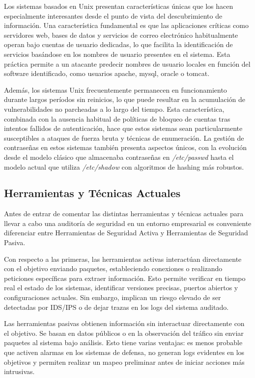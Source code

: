\documentclass[runningheads]{llncs}
\begin{document}
Los sistemas basados en Unix presentan características únicas que los hacen especialmente interesantes desde el punto de vista del descubrimiento de información. Una característica fundamental es que las aplicaciones críticas como servidores web, bases de datos y servicios de correo electrónico habitualmente operan bajo cuentas de usuario dedicadas, lo que facilita la identificación de servicios basándose en los nombres de usuario presentes en el sistema. Esta práctica permite a un atacante predecir nombres de usuario locales en función del software identificado, como usuarios apache, mysql, oracle o tomcat.

Además, los sistemas Unix frecuentemente permanecen en funcionamiento durante largos períodos sin reinicios, lo que puede resultar en la acumulación de vulnerabilidades no parcheadas a lo largo del tiempo. Esta característica, combinada con la ausencia habitual de políticas de bloqueo de cuentas tras intentos fallidos de autenticación, hace que estos sistemas sean particularmente susceptibles a ataques de fuerza bruta y técnicas de enumeración. La gestión de contraseñas en estos sistemas también presenta aspectos únicos, con la evolución desde el modelo clásico que almacenaba contraseñas en \textit{/etc/passwd} hasta el modelo actual que utiliza \textit{/etc/shadow} con algoritmos de hashing más robustos.

\subsection{Herramientas y Técnicas Actuales}


\indent Antes de entrar de comentar las distintas herramientas y técnicas actuales para llevar a cabo una auditoría de seguridad en un entorno empresarial es conveniente diferenciar entre Herramientas de Seguridad Activa y Herramientas de Seguridad Pasiva.

Con respecto a las primeras, las herramientas activas interactúan directamente con el objetivo enviando paquetes, estableciendo conexiones o realizando peticiones específicas para extraer información. Esto permite verificar en tiempo real el estado de los sistemas, identificar versiones precisas, puertos abiertos y configuraciones actuales. Sin embargo, implican un riesgo elevado de ser detectadas por IDS/IPS o de dejar trazas en los logs del sistema auditado.

Las herramientas pasivas obtienen información sin interactuar directamente con el objetivo. Se basan en datos públicos o en la observación del tráfico sin enviar paquetes al sistema bajo análisis. Esto tiene varias ventajas: es menos probable que activen alarmas en los sistemas de defensa, no generan logs evidentes en los objetivos y permiten realizar un mapeo preliminar antes de iniciar acciones más intrusivas.
\end{document}
